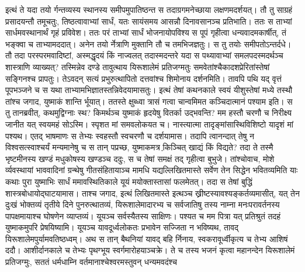 \vakya इत्थं ते यदा तयो र्गन्तव्यस्य स्थानस्य समीपमुपातिष्ठन्त स तदाग्रगमनेच्छाया लक्षणमदर्शयत्।
\vakya तौ तु साग्रहं प्रसादयन्तौ तमूचतुः, तिष्ठत्वावाभ्यां सार्धं, यतः सायंसमय आसन्नौ दिनावसानञ्च प्रतिभाति। ततः स ताभ्यां सार्धमवस्थानार्थं गृहं प्रविवेश।
\vakya ततः परं ताभ्यां सार्धं भोजनायोपविश्य स पूपं गृहीत्वा धन्यवादमकार्षीत्, तं भङ्क्वा च ताभ्यामददात्।
\vakya अनेन तयो र्नेत्राणि मुक्तानि तौ च तमभिजज्ञतुः। स तु तयोः समीपतोऽन्तर्दधे।
\vakya तौ तदा परस्परमवादिष्टां, अस्मद्धृदयं किं नाज्वलत् तदास्मदन्तरे यदा स पथ्यावाभ्यां समलपदस्मदर्थञ्च शास्त्राणि व्याख्यत्?
\vakya तस्मिन्नेव दण्डे तावुत्थाय यिरूशालेमं प्रतिजग्मतुः समवेतांश्चैकादशप्रेरितांस्तेषां सङ्गिनश्च प्रापतुः।
\vakya तेऽवदन् सत्यं प्रभुरुत्थापितो दत्तवांश्च शिमोनाय दर्शनमिति।
\vakya तावपि पथि यद् वृत्तं पूपभञ्जने च स यथा ताभ्यामभिज्ञातस्तन्निवेदयामासतुः। 
\vakya इत्थं तेषां कथनकाले स्वयं यीशुस्तेषां मध्ये तस्थौ तांश्च जगाद, युष्माकं शान्ति र्भूयात्।
\vakya ततस्ते क्षुब्ध्वा त्रासं गत्वा चान्वमिमत कञ्चिदात्मानं पश्याम इति।
\vakya स तु तानब्रवीत्, कथमुद्विग्नाः स्थ? किमर्थञ्च युष्माकं हृदयेषु वितर्का उद्भवन्ति?
\vakya मम हस्तौ चरणौ च निरीक्ष्य जानीत यत् स्वयमहं सोऽस्मि। स्पृशत मां समवलोकयत च। नास्त्यात्मा तादृङ्मांसास्थिविशिष्टो यादृशं मां पश्यथ।
\vakya एतद् भाषमाणः स तेभ्यः स्वहस्तौ स्वचरणौ च दर्शयामास।
\vakya तदापि त्वानन्दात् तेषु न विश्वसत्स्वाश्चर्यं मन्यमानेषु च स तान् पप्रच्छ, युष्माकमत्र कि़ञ्चित् खाद्यं किं विद्यते?
\vakya तदा ते तस्मै भृष्टमीनस्य खण्डं मधुकोषस्य खण्डञ्च ददुः,
\vakya स च तेषां समक्षं तद् गृहीत्वा बुभुजे।
\vakya तांश्चोवाच, मोशे र्व्यवस्थायां भाववादिनां ग्रन्थेषु गीतसंहितायाञ्च मामधि यद्यल्लिखितमास्ते सर्वेण तेन सिद्धेन भवितव्यमिति याः कथाः पुरा युष्माभिः सार्धं ममावस्थितिकाले यूयं मयोक्तास्तासां फलमेतत्।
\vakya तदा स तेषां बुद्धिं शास्त्रबोधायोद्घाटयामास।
\vakya ताश्च जगाद, इत्थं लिखितमास्ते इत्थञ्च ख्रीष्टस्यावश्यङ्कर्तव्यमासीत्, यत् तेन दुःखं भोक्तव्यं तृतीये दिने पुनरुत्थातव्यं,
\vakya यिरूशालेमादारभ्य च सर्वजातिषु तस्य नाम्ना मनःपरावर्तनस्य पापक्षमायाश्च घोषणेन व्याप्तव्यं।
\vakya यूयञ्च सर्वस्यैतस्य साक्षिणः।
\vakya पश्यत च मम पित्रा यत् प्रतिश्रुतं तदहं युष्माकमुपरि प्रेषयिष्यामि। यूयञ्च यावदूर्ध्वलोकतः प्रभावेन सज्जिता न भविष्यथ, तावद् यिरूशालेमपुर्यामवतिष्ठध्वम्।
\vakya अथ स तान् बैथनियां यावद् बहि र्निनाय, स्वकरावूर्ध्वीकृत्य च तेभ्य आशिषं ददौ।
\vakya आशीर्दानकाले च तेभ्यः पृथग्भूय स्वर्गमारोहयाञ्चक्रे।
\vakya ते च तस्य भजनं कृत्वा महानन्देन यिरूशालेमं प्रतिजग्मुः,
\vakya सततं धर्मधाम्नि वर्तमानाश्चेश्वरमस्तुवन् धन्यमवदंश्च\eoc